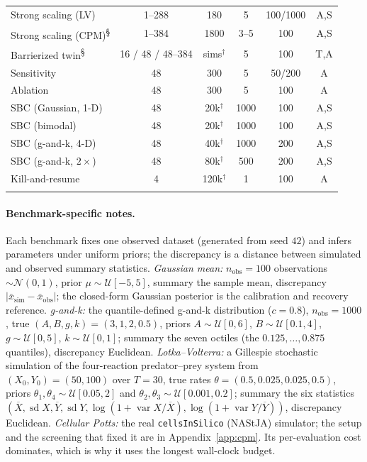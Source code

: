 \documentclass[pdflatex,sn-mathphys-num]{sn-jnl}
\theoremstyle{plain}
\theoremstyle{definition}
\begin{document}
\begin{appendices}
\begin{table}[t]
\begin{tabular}{@{}lccccc@{}}
Strong scaling (LV)    & 1--288 & 180  & 5 & 100/1000 & A,S \\
Strong scaling (CPM)\textsuperscript{\S} & 1--384 & 1800 & 3--5 & 100 & A,S \\
Barrierized twin\textsuperscript{\S}  & 16 / 48 / 48--384 & sims$^\dagger$ & 5 & 100 & T,A \\
Sensitivity            & 48 & 300  & 5   & 50/200 & A \\
Ablation               & 48 & 300  & 5   & 100 & A \\
SBC (Gaussian, 1-D)    & 48 & 20k$^\dagger$  & 1000 & 100 & A,S \\
SBC (bimodal)          & 48 & 20k$^\dagger$  & 1000 & 100 & A,S \\
SBC (g-and-k, 4-D)     & 48 & 40k$^\dagger$  & 1000 & 200 & A,S \\
SBC (g-and-k, $2\times$) & 48 & 80k$^\dagger$ & 500 & 200 & A,S \\
Kill-and-resume        & 4  & 120k$^\dagger$ & 1    & 100 & A \\
\botrule
\end{tabular}
\end{table}

\paragraph{Benchmark-specific notes.} Each benchmark fixes one observed dataset (generated from seed $42$) and infers parameters under uniform priors; the discrepancy is a distance between simulated and observed summary statistics. \emph{Gaussian mean:} $n_{\text{obs}}=100$ observations $\sim\mathcal{N}(0,1)$, prior $\mu\sim\mathcal{U}[-5,5]$, summary the sample mean, discrepancy $|\bar x_{\text{sim}}-\bar x_{\text{obs}}|$; the closed-form Gaussian posterior is the calibration and recovery reference. \emph{g-and-k:} the quantile-defined g-and-k distribution ($c=0.8$), $n_{\text{obs}}=1000$, true $(A,B,g,k)=(3,1,2,0.5)$, priors $A\sim\mathcal{U}[0,6]$, $B\sim\mathcal{U}[0.1,4]$, $g\sim\mathcal{U}[0,5]$, $k\sim\mathcal{U}[0,1]$; summary the seven octiles (the $0.125,\dots,0.875$ quantiles), discrepancy Euclidean. \emph{Lotka--Volterra:} a Gillespie stochastic simulation \cite{gillespie1977} of the four-reaction predator--prey system from $(X_0,Y_0)=(50,100)$ over $T=30$, true rates $\theta=(0.5,0.025,0.025,0.5)$, priors $\theta_1,\theta_4\sim\mathcal{U}[0.05,2]$ and $\theta_2,\theta_3\sim\mathcal{U}[0.001,0.2]$; summary the six statistics $(\overline X,\operatorname{sd}X,\overline Y,\operatorname{sd}Y,\log(1{+}\operatorname{var}X/\overline X),\log(1{+}\operatorname{var}Y/\overline Y))$, discrepancy Euclidean. \emph{Cellular Potts:} the real \texttt{cellsInSilico} (NAStJA) simulator; the setup and the screening that fixed it are in Appendix~\ref{app:cpm}. Its per-evaluation cost dominates, which is why it uses the longest wall-clock budget.


\end{appendices}
\end{document}
